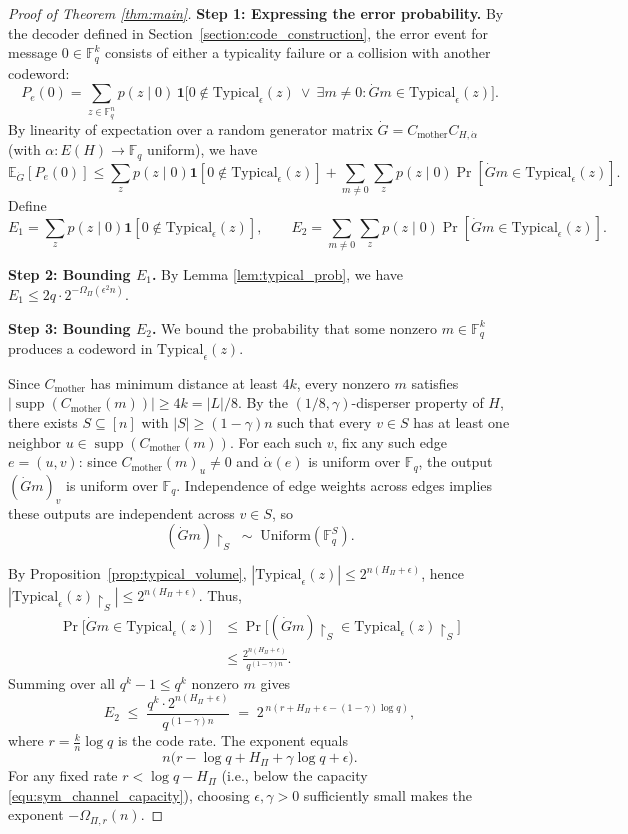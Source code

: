 \documentclass[11pt]{article}
\DeclareMathOperator{\supp}{supp}
\newcommand{\basecode}{C_{\text{mother}}}
\newcommand{\typical}{\mathrm{Typical}}
\theoremstyle{named}
\begin{document}
\begin{proof}[Proof of Theorem \ref{thm:main}]
\noindent\textbf{Step 1: Expressing the error probability.}  
By the decoder defined in Section~\ref{section:code_construction}, the error event for message $0 \in \mathbb{F}_q^k$ consists of either a typicality failure or a collision with another codeword:
\[
P_e(0) = \sum_{z \in \mathbb{F}_q^n} p(z \mid 0) \, 
\mathbf{1}\Big[ 0 \notin \typical_\epsilon(z) \ \vee \ \exists m \neq 0 : \dot G m \in \typical_\epsilon(z) \Big].
\]
By linearity of expectation over a random generator matrix $\dot G = \basecode C_{H, \dot\alpha}$ (with $\alpha : E(H) \to \mathbb{F}_q$ uniform), we have
\[
\mathbb{E}_{\dot G}[P_e(0)]
\le \sum_{z} p(z \mid 0) \mathbf{1}[0 \notin \typical_\epsilon(z)] 
+ \sum_{m \neq 0} \sum_{z} p(z \mid 0) \Pr[\dot G m \in \typical_\epsilon(z)].
\]
Define
\[
E_1 = \sum_{z} p(z \mid 0) \mathbf{1}[0 \notin \typical_\epsilon(z)], \qquad
E_2 = \sum_{m \neq 0} \sum_{z} p(z \mid 0) \Pr[\dot G m \in \typical_\epsilon(z)].
\]

\noindent\textbf{Step 2: Bounding $E_1$.}  
By Lemma \ref{lem:typical_prob}, we have $E_1 \le 2q \cdot 2^{-\Omega_\Pi(\epsilon^2 n)}$.

\noindent\textbf{Step 3: Bounding $E_2$.}  
We bound the probability that some nonzero $m \in \mathbb{F}_q^k$ produces a codeword in $\typical_\epsilon(z)$.

Since $\basecode$ has minimum distance at least $4k$, every nonzero $m$ satisfies
$|\supp(\basecode(m))| \ge 4k = |L|/8$.
By the
$(1/8,\gamma)$-disperser property of $H$, there exists $S \subseteq [n]$ with
$|S| \ge (1-\gamma)n$ such that every $v \in S$ has at least one neighbor
$u \in \supp(\basecode(m))$. For each such $v$, fix any such edge $e=(u,v)$:
since $\basecode(m)_u \neq 0$ and $\dot\alpha(e)$ is uniform over $\mathbb{F}_q$,
the output $(\dot G m)_v$ is uniform over $\mathbb{F}_q$. Independence of edge
weights across edges implies these outputs are independent across $v \in S$, so
\[
    (\dot G m)\restriction_S \;\sim\; \mathrm{Uniform}(\mathbb{F}_q^S).
\]

By Proposition~\ref{prop:typical_volume}, $|\typical_\epsilon(z)| \le 2^{n(H_\Pi+\epsilon)}$, hence $|\typical_\epsilon(z)\restriction_S| \le 2^{n(H_\Pi+\epsilon)}$. Thus,
\begin{align*}
    \Pr\bigl[\dot G m \in \typical_\epsilon(z)\bigr]
    &\le \Pr\bigl[(\dot G m)\restriction_S \in \typical_\epsilon(z)\restriction_S\bigr] \\
    &\le \frac{2^{n(H_\Pi+\epsilon)}}{q^{(1-\gamma)n}}.
\end{align*}
Summing over all $q^k - 1 \le q^k$ nonzero $m$ gives
\[
    E_2 \;\le\; \frac{q^k \cdot 2^{n(H_\Pi+\epsilon)}}{q^{(1-\gamma)n}}
    \;=\; 2^{\,n\left(r + H_\Pi + \epsilon - (1-\gamma)\log q\right)},
\]
where $r = \frac{k}{n}\log q$ is the code rate. The exponent equals
\begin{equation}
\label{equ:error_exponent}
    n\bigl(r - \log q + H_\Pi + \gamma\log q + \epsilon\bigr).
\end{equation}
For any fixed rate $r < \log q - H_\Pi$ (i.e., below the capacity
\eqref{equ:sym_channel_capacity}), choosing $\epsilon, \gamma > 0$ sufficiently small
makes the exponent $-\Omega_{\Pi,r}(n)$.


\end{proof}
\end{document}
